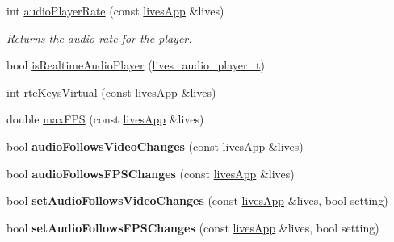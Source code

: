 \begin{DoxyCompactItemize}
\item 
int \hyperlink{namespacelives_1_1prefs_ae176785f5d16a4fa28dc9ebd7e3f80d5}{audio\-Player\-Rate} (const \hyperlink{classlives_1_1livesApp}{lives\-App} \&lives)
\begin{DoxyCompactList}\small\item\em Returns the audio rate for the player. \end{DoxyCompactList}\item 
bool \hyperlink{namespacelives_1_1prefs_a8c55d19e8559c9dec0d65a6ecf13206e}{is\-Realtime\-Audio\-Player} (\hyperlink{liblives_8hpp_a52acbff46461d04771fba866edd01139}{lives\-\_\-audio\-\_\-player\-\_\-t})
\item 
int \hyperlink{namespacelives_1_1prefs_a7c4b71b02f07b43d032ed749406ebca3}{rte\-Keys\-Virtual} (const \hyperlink{classlives_1_1livesApp}{lives\-App} \&lives)
\item 
double \hyperlink{namespacelives_1_1prefs_ab9a8faf195a2de6d7cb83110bacad073}{max\-F\-P\-S} (const \hyperlink{classlives_1_1livesApp}{lives\-App} \&lives)
\item 
\hypertarget{namespacelives_1_1prefs_a228116cbcc15eb524db6aab304981ac7}{bool {\bfseries audio\-Follows\-Video\-Changes} (const \hyperlink{classlives_1_1livesApp}{lives\-App} \&lives)}\label{namespacelives_1_1prefs_a228116cbcc15eb524db6aab304981ac7}

\item 
\hypertarget{namespacelives_1_1prefs_a3f9ae1a7fd2ab60677e33364d89e4b8f}{bool {\bfseries audio\-Follows\-F\-P\-S\-Changes} (const \hyperlink{classlives_1_1livesApp}{lives\-App} \&lives)}\label{namespacelives_1_1prefs_a3f9ae1a7fd2ab60677e33364d89e4b8f}

\item 
\hypertarget{namespacelives_1_1prefs_a35e29d686c4afd825328142e582c27ff}{bool {\bfseries set\-Audio\-Follows\-Video\-Changes} (const \hyperlink{classlives_1_1livesApp}{lives\-App} \&lives, bool setting)}\label{namespacelives_1_1prefs_a35e29d686c4afd825328142e582c27ff}

\item 
\hypertarget{namespacelives_1_1prefs_a42f04e18a63994a5944aee1d6bfda78d}{bool {\bfseries set\-Audio\-Follows\-F\-P\-S\-Changes} (const \hyperlink{classlives_1_1livesApp}{lives\-App} \&lives, bool setting)}\label{namespacelives_1_1prefs_a42f04e18a63994a5944aee1d6bfda78d}


\end{DoxyCompactItemize}
